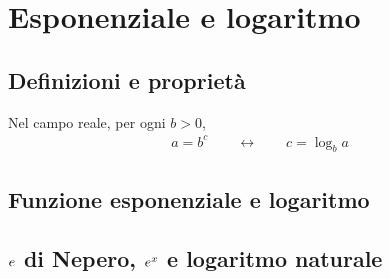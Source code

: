 \documentclass[letterpaper,10pt,english]{jupyterBook}
\begin{document}
\sphinxstepscope


\chapter{Esponenziale e logaritmo}
\label{\detokenize{ch/exponential_logarithm:esponenziale-e-logaritmo}}\label{\detokenize{ch/exponential_logarithm:math-hs-exp-log}}\label{\detokenize{ch/exponential_logarithm::doc}}

\section{Definizioni e proprietà}
\label{\detokenize{ch/exponential_logarithm:definizioni-e-proprieta}}
\sphinxAtStartPar
Nel campo reale, per ogni \(b > 0\),
\begin{equation*}
\begin{split}a = b^c \qquad \leftrightarrow \qquad c = \log_{b} a \end{split}
\end{equation*}

\section{Funzione esponenziale e logaritmo}
\label{\detokenize{ch/exponential_logarithm:funzione-esponenziale-e-logaritmo}}

\section{\protect\(e\protect\) di Nepero, \protect\(e^x\protect\) e logaritmo naturale}
\label{\detokenize{ch/exponential_logarithm:e-di-nepero-e-x-e-logaritmo-naturale}}
\end{document}
